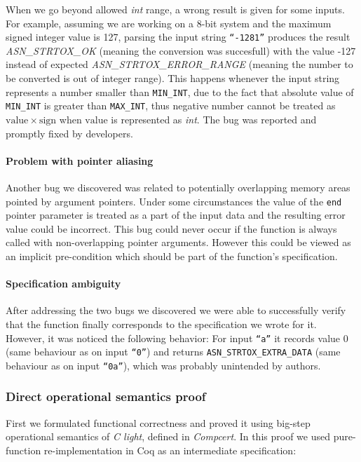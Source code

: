 \documentclass[acmsmall,nonacm]{acmart}
\begin{document}
When we go beyond allowed \textit{int} range, a wrong result is given
for some inputs. For example, assuming we are working on a 8-bit
system and the maximum signed integer value is 127, parsing the input
string \texttt{``-1281''} produces the result
\emph{ASN\_STRTOX\_OK} (meaning the conversion was succesfull) with the value -127 instead of expected
\emph{ASN\_STRTOX\_ERROR\_RANGE} (meaning the number to be converted is out of integer range). This happens whenever the input
string represents a number smaller than \texttt{MIN\_INT}, due to the
fact that absolute value of \texttt{MIN\_INT} is greater than
\texttt{MAX\_INT}, thus negative number cannot be treated as
$\mathrm{value}\times\mathrm{sign}$ when $\mathrm{value}$ is
represented as \textit{int}. The bug was reported and promptly fixed by
developers.

\paragraph{Problem with pointer aliasing}

Another bug we discovered was related to potentially overlapping
memory areas pointed by argument pointers. Under some circumstances
the value of the \texttt{end} pointer parameter is treated as a part
of the input data and the resulting error value could be
incorrect. This bug could never occur if the function is always called
with non-overlapping pointer arguments. However this could be viewed
as an implicit pre-condition which should be part of the function's
specification.

\paragraph{Specification ambiguity}

After addressing the two bugs we discovered we were able to
successfully verify that the function finally corresponds to the
specification we wrote for it. However, it was noticed the following
behavior: For input \texttt{``a''} it records value $0$ (same behaviour
as on input \texttt{``0''}) and returns
\texttt{ASN\_STRTOX\_EXTRA\_DATA} (same behaviour as on input
\texttt{``0a''}), which was probably unintended by authors.
  
\subsubsection{Direct operational semantics proof}

First we formulated functional correctness and proved it using
big-step operational semantics of \textit{C light}, defined in
\textit{Compcert}. In this proof we used pure-function
re-implementation in Coq as an intermediate specification:
\end{document}
